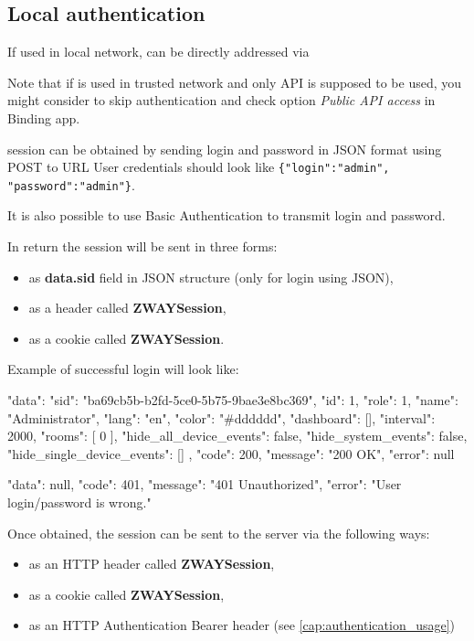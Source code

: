 \subsection{Local authentication}
\label{cap:authentication_local}

If used in local network, \zway can be directly addressed via 

Note that if \zway is used in trusted network and only \zwave API is supposed to be used, you might consider to skip authentication and check option \textit{Public API access} in \zwave Binding app.

\zway session can be obtained by sending login and password
in JSON format using POST to URL 
User credentials should look like \texttt{\{"login":"admin", "password":"admin"\}}.

It is also possible to use Basic Authentication to transmit login and password.

In return the session will be sent in three forms:
\begin{itemize}
\item as \textbf{data.sid} field in JSON structure (only for login using JSON),
\item as a header called \textbf{ZWAYSession},
\item as a cookie called \textbf{ZWAYSession}.
\end{itemize}

Example of successful login will look like:
\begin{listingverbatim}
{
    "data": {
        "sid": "ba69cb5b-b2fd-5ce0-5b75-9bae3e8bc369",
        "id": 1,
        "role": 1,
        "name": "Administrator",
        "lang": "en",
        "color": "#dddddd",
        "dashboard": [],
        "interval": 2000,
        "rooms": [
            0
        ],
        "hide_all_device_events": false,
        "hide_system_events": false,
        "hide_single_device_events": []
    },
    "code": 200,
    "message": "200 OK",
    "error": null
}
\end{listingverbatim}

\begin{listingverbatim}
{
    "data": null,
    "code": 401,
    "message": "401 Unauthorized",
    "error": "User login/password is wrong."
}
\end{listingverbatim}

Once obtained, the session can be sent to the \zway server via the following ways:
\begin{itemize}
\item as an HTTP header called \textbf{ZWAYSession},
\item as a cookie called \textbf{ZWAYSession},
\item as an HTTP Authentication Bearer header (see \ref{cap:authentication_usage})
\end{itemize}


